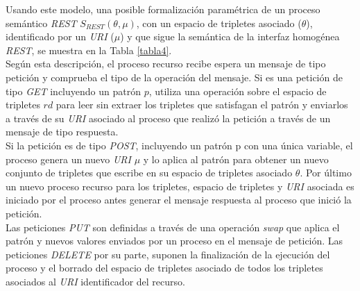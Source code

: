 Usando este modelo, una posible formalizaci\'on param\'etrica de un proceso sem\'antico \textit{REST} $S_{REST}(\theta,\mu)$, con un espacio de tripletes asociado ($\theta$), identificado por un \textit{URI} ($\mu$)  y que sigue la sem\'antica de la interfaz homog\'enea \textit{REST}, se muestra en la Tabla \ref{tabla4}.\\
Seg\'un esta descripci\'on, el proceso recurso recibe espera un mensaje de tipo petici\'on y comprueba el tipo de la operaci\'on del mensaje.
Si es una petici\'on de tipo \textit{GET} incluyendo un patr\'on $p$, utiliza una operaci\'on sobre el espacio de tripletes $rd$ para leer sin extraer los tripletes que satisfagan el patr\'on y enviarlos a trav\'es de su \textit{URI} asociado al proceso que realiz\'o la petici\'on a trav\'es de un mensaje de tipo respuesta.\\
Si la petici\'on es de tipo \textit{POST}, incluyendo un patr\'on p con una \'unica variable, el proceso genera un nuevo \textit{URI} $\mu$ y lo aplica al patr\'on para obtener un nuevo conjunto de tripletes que escribe en su espacio de tripletes asociado $\theta$. Por \'ultimo un nuevo proceso recurso para los tripletes, espacio de tripletes y \textit{URI} asociada es iniciado por el proceso antes generar el mensaje respuesta al proceso que inici\'o la petici\'on.\\
Las peticiones \textit{PUT} son definidas a trav\'es de una operaci\'on \textit{swap} que aplica el patr\'on y nuevos valores enviados por un proceso en el mensaje de petici\'on. Las peticiones \textit{DELETE} por su parte, suponen la finalizaci\'on de la ejecuci\'on del proceso y el borrado del espacio de tripletes asociado de todos los tripletes asociados al \textit{URI} identificador del recurso.\\
